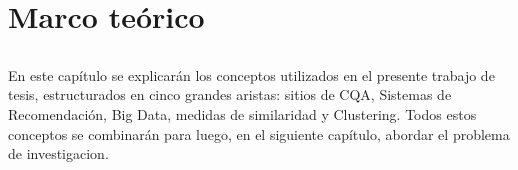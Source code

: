 \chapter*{Marco teórico}\label{ch:marcoteorico}

\section*{}
\addtocounter{section}{1}
\setcounter{subsection}{0}

En este capítulo se explicarán los conceptos utilizados en el presente trabajo de tesis, estructurados en cinco grandes aristas: sitios de CQA, Sistemas de Recomendación, Big Data, medidas de similaridad y Clustering. Todos estos conceptos se combinarán para luego, en el siguiente capítulo, abordar el problema de investigacion.








